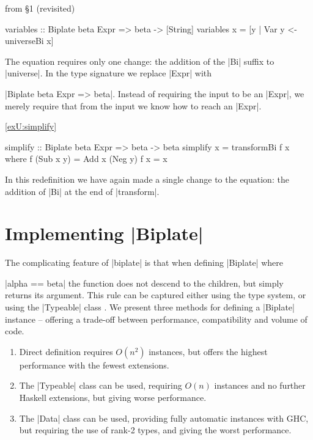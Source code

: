 \begin{exampleany}{from \S1 (revisited)}
\begin{code}
variables :: Biplate beta Expr => beta -> [String]
variables x = [y | Var y <- universeBi x]
\end{code}

The equation requires only one change: the addition of the |Bi| suffix to |universe|. In the type signature we replace |Expr| with \ignore|Biplate beta Expr => beta|. Instead of requiring the input to be an |Expr|, we merely require that from the input we know how to reach an |Expr|.
\end{exampleany}

\begin{examplerevisit}{\ref{exU:simplify}}
\begin{code}
simplify :: Biplate beta Expr => beta -> beta
simplify x = transformBi f x
    where  f (Sub x y)  = Add x (Neg y)
           f x          = x
\end{code}

In this redefinition we have again made a single change to the equation: the addition of |Bi| at the end of |transform|.
\end{examplerevisit}

\section{Implementing |Biplate|}
\label{secU:implement_playex}


The complicating feature of |biplate| is that when defining |Biplate| where \ignore|alpha == beta| the function does not descend to the children, but simply returns its argument. This rule can be captured either using the type system, or using the |Typeable| class \cite{lammel:syb}. We present three methods for defining a |Biplate| instance -- offering a trade-off between performance, compatibility and volume of code.

\begin{enumerate}
\item Direct definition requires $O(n^2)$ instances, but offers the highest performance with the fewest extensions.
\item The |Typeable| class can be used, requiring $O(n)$ instances and no further Haskell extensions, but giving worse performance.
\item The |Data| class can be used, providing fully automatic instances with GHC, but requiring the use of rank-2 types, and giving the worst performance.
\end{enumerate}

